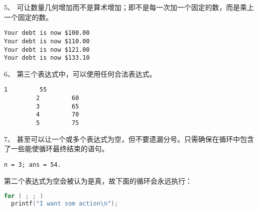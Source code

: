 \begin{frame}[fragile]
5、 可让数量几何增加而不是算术增加；即不是每一次加一个固定的数，而是乘上一个固定的数。

\end{frame}

\begin{frame}[fragile]
\begin{lstlisting}[backgroundcolor=\color{red!10}]
Your debt is now $100.00
Your debt is now $110.00
Your debt is now $121.00
Your debt is now $133.10
\end{lstlisting}
\end{frame}

\begin{frame}[fragile]
6、 第三个表达式中，可以使用任何合法表达式。

\end{frame}

\begin{frame}[fragile]
\begin{lstlisting}[backgroundcolor=\color{red!10}]
         1         55
         2         60
         3         65
         4         70
         5         75
\end{lstlisting}
\end{frame}

\begin{frame}[fragile]
7、 甚至可以让一个或多个表达式为空，但不要遗漏分号。只需确保在循环中包含了一些能使循环最终结束的语句。
\end{frame}

\begin{frame}[fragile]
  
\end{frame}

\begin{frame}[fragile]

\begin{lstlisting}[backgroundcolor=\color{red!10}]
n = 3; ans = 54.
\end{lstlisting}
\end{frame}

\begin{frame}[fragile]
第二个表达式为空会被认为是真，故下面的循环会永远执行：
\begin{lstlisting}[language=c,backgroundcolor=\color{red!10}]
for ( ; ; )
  printf("I want som action\n");
\end{lstlisting}

\end{frame}

